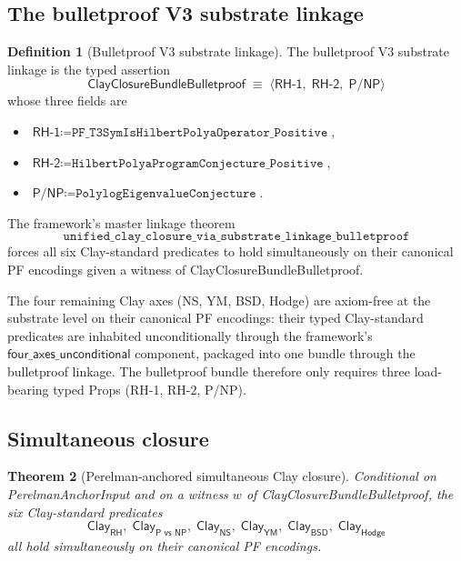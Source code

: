 \documentclass[11pt,a4paper]{amsart}
\theoremstyle{plain}
\newtheorem{theorem}{Theorem}[section]
\theoremstyle{definition}
\newtheorem{definition}[theorem]{Definition}
\begin{document}
\subsection{The bulletproof V3 substrate linkage}

\begin{definition}[Bulletproof V3 substrate linkage]\label{def:bulletproof-v3}
The bulletproof V3 substrate linkage is the typed assertion
\[
\textsf{ClayClosureBundleBulletproof} \;\equiv\; \langle \textsf{RH-1},\;\textsf{RH-2},\;\textsf{P/NP}\rangle
\]
whose three fields are
\begin{itemize}[itemsep=2pt]
\item $\textsf{RH-1} \coloneqq \texttt{PF\_T3SymIsHilbertPolyaOperator\_Positive}$,
\item $\textsf{RH-2} \coloneqq \texttt{HilbertPolyaProgramConjecture\_Positive}$,
\item $\textsf{P/NP} \coloneqq \texttt{PolylogEigenvalueConjecture}$.
\end{itemize}
The framework's master linkage theorem
\[
\texttt{unified\_clay\_closure\_via\_substrate\_linkage\_bulletproof}
\]
forces all six Clay-standard predicates to hold simultaneously on their canonical PF encodings given a witness of \textsf{ClayClosureBundleBulletproof}.
\end{definition}

The four remaining Clay axes (NS, YM, BSD, Hodge) are axiom-free at the substrate level on their canonical PF encodings: their typed Clay-standard predicates are inhabited unconditionally through the framework's $\textsf{four\_axes\_unconditional}$ component, packaged into one bundle through the bulletproof linkage. The bulletproof bundle therefore only requires three load-bearing typed Props (\textsf{RH-1}, \textsf{RH-2}, \textsf{P/NP}).

\subsection{Simultaneous closure}

\begin{theorem}[Perelman-anchored simultaneous Clay closure]\label{thm:perelman-simultaneous}
Conditional on \textsf{PerelmanAnchorInput} and on a witness $w$ of \textsf{ClayClosureBundleBulletproof}, the six Clay-standard predicates
\[
\textsf{Clay}_{\textsf{RH}},\;\textsf{Clay}_{\textsf{P vs NP}},\;\textsf{Clay}_{\textsf{NS}},\;\textsf{Clay}_{\textsf{YM}},\;\textsf{Clay}_{\textsf{BSD}},\;\textsf{Clay}_{\textsf{Hodge}}
\]
all hold simultaneously on their canonical PF encodings.
\end{theorem}
\end{document}
